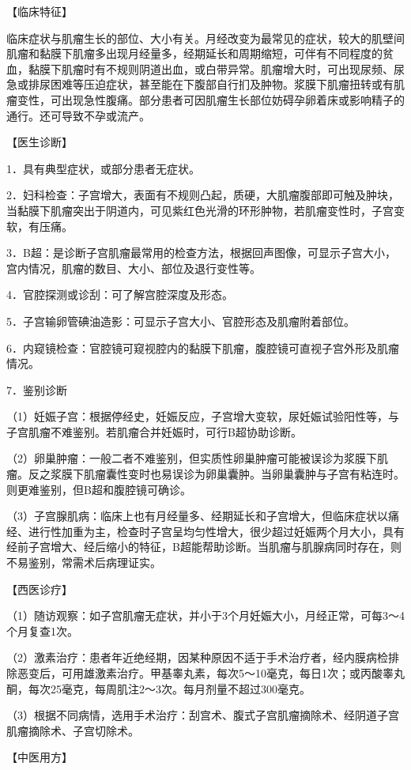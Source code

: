 \documentclass[12pt,UTF8,openany]{ctexbook}
\begin{document}
【临床特征】

临床症状与肌瘤生长的部位、大小有关。月经改变为最常见的症状，较大的肌壁间肌瘤和黏膜下肌瘤多出现月经量多，经期延长和周期缩短，可伴有不同程度的贫血，黏膜下肌瘤时有不规则阴道出血，或白带异常。肌瘤增大时，可出现尿频、尿急或排尿困难等压迫症状，甚至能在下腹部自行扪及肿物。浆膜下肌瘤扭转或有肌瘤变性，可出现急性腹痛。部分患者可因肌瘤生长部位妨碍孕卵着床或影响精子的通行。还可导致不孕或流产。

【医生诊断】

1．具有典型症状，或部分患者无症状。

2．妇科检查：子宫增大，表面有不规则凸起，质硬，大肌瘤腹部即可触及肿块，当黏膜下肌瘤突出于阴道内，可见紫红色光滑的环形肿物，若肌瘤变性时，子宫变软，有压痛。

3．B超：是诊断子宫肌瘤最常用的检查方法，根据回声图像，可显示子宫大小，宫内情况，肌瘤的数目、大小、部位及退行变性等。

4．官腔探测或诊刮：可了解宫腔深度及形态。

5．子宫输卵管碘油造影：可显示子宫大小、官腔形态及肌瘤附着部位。

6．内窥镜检查：官腔镜可窥视腔内的黏膜下肌瘤，腹腔镜可直视子宫外形及肌瘤情况。

7．鉴别诊断

（1）妊娠子宫：根据停经史，妊娠反应，子宫增大变软，尿妊娠试验阳性等，与子宫肌瘤不难鉴别。若肌瘤合并妊娠时，可行B超协助诊断。

（2）卵巢肿瘤：一般二者不难鉴别，但实质性卵巢肿瘤可能被误诊为浆膜下肌瘤。反之浆膜下肌瘤囊性变时也易误诊为卵巢囊肿。当卵巢囊肿与子宫有粘连时。则更难鉴别，但B超和腹腔镜可确诊。

（3）子宫腺肌病：临床上也有月经量多、经期延长和子宫增大，但临床症状以痛经、进行性加重为主，检查时子宫呈均匀性增大，很少超过妊娠两个月大小，具有经前子宫增大、经后缩小的特征，B超能帮助诊断。当肌瘤与肌腺病同时存在，则不易鉴别，常需术后病理证实。

【西医诊疗】

（1）随访观察：如子宫肌瘤无症状，并小于3个月妊娠大小，月经正常，可每3～4个月复查1次。

（2）激素治疗：患者年近绝经期，因某种原因不适于手术治疗者，经内膜病检排除恶变后，可用雄激素治疗。甲基睾丸素，每次5～10毫克，每日1次；或丙酸睾丸酮，每次25毫克，每周肌注2～3次。每月剂量不超过300毫克。

（3）根据不同病情，选用手术治疗：刮宫术、腹式子宫肌瘤摘除术、经阴道子宫肌瘤摘除术、子宫切除术。

【中医用方】
\end{document}
